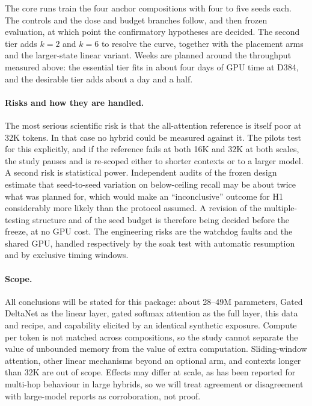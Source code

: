 \documentclass[10pt,a4paper]{article}
\begin{document}
The core runs train the four anchor compositions with four to five seeds each. The controls and the
dose and budget branches follow, and then frozen evaluation, at which point the confirmatory
hypotheses are decided. The second tier adds $k=2$ and $k=6$ to resolve the curve, together with the
placement arms and the larger-state linear variant. Weeks are planned around the throughput measured
above: the essential tier fits in about four days of GPU time at D384, and the desirable tier adds
about a day and a half.

\paragraph{Risks and how they are handled.}
The most serious scientific risk is that the all-attention reference is itself poor at 32K tokens.
In that case no hybrid could be measured against it. The pilots test for this explicitly, and if the
reference fails at both 16K and 32K at both scales, the study pauses and is re-scoped either to
shorter contexts or to a larger model. A second risk is statistical power. Independent audits of the
frozen design estimate that seed-to-seed variation on below-ceiling recall may be about twice what
was planned for, which would make an ``inconclusive'' outcome for H1 considerably more likely than
the protocol assumed. A revision of the multiple-testing structure and of the seed budget is
therefore being decided before the freeze, at no GPU cost. The engineering risks are the watchdog
faults and the shared GPU, handled respectively by the soak test with automatic resumption and by
exclusive timing windows.

\paragraph{Scope.}
All conclusions will be stated for this package: about 28--49M parameters, Gated DeltaNet as the
linear layer, gated softmax attention as the full layer, this data and recipe, and capability
elicited by an identical synthetic exposure. Compute per token is not matched across compositions,
so the study cannot separate the value of unbounded memory from the value of extra computation.
Sliding-window attention, other linear mechanisms beyond an optional arm, and contexts longer than
32K are out of scope. Effects may differ at scale, as has been reported for multi-hop behaviour in
large hybrids, so we will treat agreement or disagreement with large-model reports as
corroboration, not proof.
\end{document}
